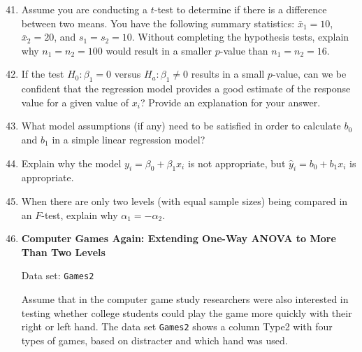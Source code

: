 \documentclass[
]{book}
\begin{document}
\begin{enumerate}
  \setcounter{enumi}{40}
  \item Assume you are conducting a $t$-test to determine if there is a difference between two means. You have the following summary statistics: $\bar{x}_1 = 10$, $\bar{x}_2 = 20$, and $s_1 = s_2 = 10$. Without completing the hypothesis tests, explain why $n_1 = n_2 = 100$ would result in a smaller $p$-value than $n_1 = n_2 = 16$.

  \item If the test $H_0\colon \beta_1 = 0$ versus $H_a\colon \beta_1 \ne 0$ results in a small $p$-value, can we be confident that the regression model provides a good estimate of the response value for a given value of $x_i$? Provide an explanation for your answer.

  \item What model assumptions (if any) need to be satisfied in order to calculate $b_0$ and $b_1$ in a simple linear regression model?

  \item Explain why the model $y_i = \beta_0 + \beta_1 x_i$ is not appropriate, but $\hat{y}_i = b_0 + b_1 x_i$ is appropriate.

  \item When there are only two levels (with equal sample sizes) being compared in an $F$-test, explain why $\alpha_1 = -\alpha_2$.

  \item \textbf{Computer Games Again: Extending One-Way ANOVA to More Than Two Levels}

Data set: \texttt{Games2}

Assume that in the computer game study researchers were also interested in testing whether college students could play the game more quickly with their right or left hand. The data set \texttt{Games2} shows a column Type2 with four types of games, based on distracter and which hand was used.


\end{enumerate}
\end{document}
